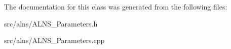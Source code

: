 The documentation for this class was generated from the following files\-:\begin{DoxyCompactItemize}
\item 
src/alns/A\-L\-N\-S\-\_\-\-Parameters.\-h\item 
src/alns/A\-L\-N\-S\-\_\-\-Parameters.\-cpp\end{DoxyCompactItemize}
